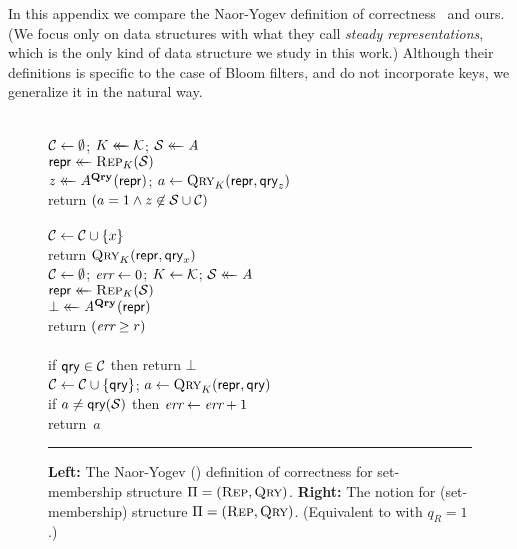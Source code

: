 \label{sec:compare-defs}
\label{sec:errepone}
\newcommand{\ny}{\notionfont{NY}}

In this appendix we compare the Naor-Yogev definition of
correctness~\cite{naor2015bloom} and ours. (We focus only on data structures
with what they call \emph{steady representations}, which is the only kind of
data structure we study in this work.)
%
Although their definitions is specific to the case of Bloom filters, and do not
incorporate keys, we generalize it in the natural way.

\begin{figure}[t]
  {
    \experimentv{$\Exp{\ny}_{\struct}(\advA)$}\\[2pt]
      $\mathcal{C} \gets \emptyset$;
      $K \mathrel{\leftarrow\mkern-14mu\leftarrow} \mathcal{K}$;
      $\mathcal{S} \mathrel{\leftarrow\mkern-14mu\leftarrow} \mathit{A}$\\
      $\mathsf{repr} \mathrel{\leftarrow\mkern-14mu\leftarrow} \textsc{Rep}_K(\mathcal{S})$\\
      $z \mathrel{\leftarrow\mkern-14mu\leftarrow} A^{\mathbf{Qry}\hspace{0.5pt}}(\mathsf{repr})$;
      $a \gets \textsc{Qry}_K(\mathsf{repr},\mathsf{qry}_z)$\\
      return $\left( a = 1 \wedge z \not\in \mathcal{S} \cup \mathcal{C} \right)$
  \\[6pt]
    \\[2pt]
      $\mathcal{C} \gets \mathcal{C} \cup \{x\}$\\
      return $\textsc{Qry}_K(\mathsf{repr}, \mathsf{qry}_x)$
  }
  {
    \\[2pt]
      $\mathcal{C} \gets \emptyset$;
      $\textit{err} \gets 0$;
      $K \gets \mathcal{K}$;
      $\mathcal{S} \mathrel{\leftarrow\mkern-14mu\leftarrow} \mathit{A}$\\
      $\mathsf{repr} \mathrel{\leftarrow\mkern-14mu\leftarrow} \textsc{Rep}_K(\mathcal{S})$\\
      $\bot \mathrel{\leftarrow\mkern-14mu\leftarrow} \mathit{A}^{\mathbf{Qry}\hspace{0.5pt}}(\mathsf{repr})$\\
      return $(\textit{err} \ge r)$
    \\[6pt]
    \oraclev{$\QRYO(\qry)$}\\[2pt]
      if $\mathsf{qry} \in \mathcal{C}$ then return $\bot$\\
      $\mathcal{C} \gets \mathcal{C} \cup \{\mathsf{qry}\}$;
      $a \gets \textsc{Qry}_K(\mathsf{repr},\mathsf{qry})$\\
      if $a \neq \mathsf{qry}(\mathcal{S})$ then $\textit{err}\gets\textit{err}+1$\\
      return~$a$
  }
  \caption{\textbf{Left:} The Naor-Yogev (\ny) definition of correctness for set-membership structure
  $\mathrm{\Pi} = (\textsc{Rep}, \textsc{Qry})$.
  \textbf{Right:} The \errepone notion for (set-membership) structure $\mathrm{\Pi} =
  (\textsc{Rep}, \textsc{Qry})$. (Equivalent to \errep with $q_R=1$.)}
  \label{fig:ny-correct}
  \vspace{6pt}\hrule
\end{figure}
